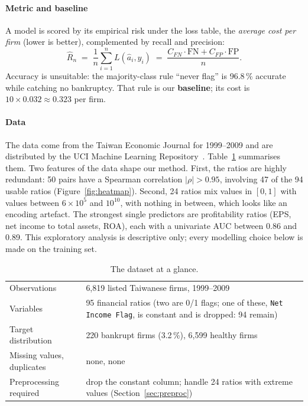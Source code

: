 \documentclass[11pt,a4paper]{article}
\newcommand{\tablefont}{\sffamily\small}
\begin{document}
\paragraph{Metric and baseline} A model is scored by its empirical risk under the loss table, the \emph{average cost per firm} (lower is better), complemented by recall and precision:
\begin{equation}\label{eq:risk}
  \hat R_n \;=\; \frac{1}{n}\sum_{i=1}^{n} L(\hat a_i, y_i) \;=\; \frac{C_{FN}\cdot \mathrm{FN} + C_{FP}\cdot \mathrm{FP}}{n}.
\end{equation}
Accuracy is unsuitable: the majority-class rule ``never flag'' is 96.8\,\% accurate while catching no bankruptcy. That rule is our \textbf{baseline}; its cost is $10 \times 0.032 \approx 0.323$ per firm.

\paragraph{Data} The data come from the Taiwan Economic Journal for 1999–2009 and are distributed by the UCI Machine Learning Repository~\cite{uci, liang}. Table~\ref{tab:data} summarises them. Two features of the data shape our method. First, the ratios are highly redundant: 50 pairs have a Spearman correlation $|\rho| > 0.95$, involving 47 of the 94 usable ratios (Figure~\ref{fig:heatmap}). Second, 24 ratios mix values in $[0,1]$ with values between $6\times10^{5}$ and $10^{10}$, with nothing in between, which looks like an encoding artefact. The strongest single predictors are profitability ratios (EPS, net income to total assets, ROA), each with a univariate AUC between 0.86 and 0.89. This exploratory analysis is descriptive only; every modelling choice below is made on the training set.

\begin{table}[htbp]\centering\tablefont
  \caption{The dataset at a glance.}\label{tab:data}
  \begin{tabularx}{0.86\linewidth}{lX}
    \toprule
    Observations & 6,819 listed Taiwanese firms, 1999–2009 \\
    Variables & 95 financial ratios (two are 0/1 flags; one of these, \texttt{Net Income Flag}, is constant and is dropped: 94 remain) \\
    Target distribution & 220 bankrupt firms (3.2\,\%), 6,599 healthy firms \\
    Missing values, duplicates & none, none \\
    Preprocessing required & drop the constant column; handle 24 ratios with extreme values (Section~\ref{sec:preproc}) \\
    \bottomrule
  \end{tabularx}
\end{table}
\end{document}
